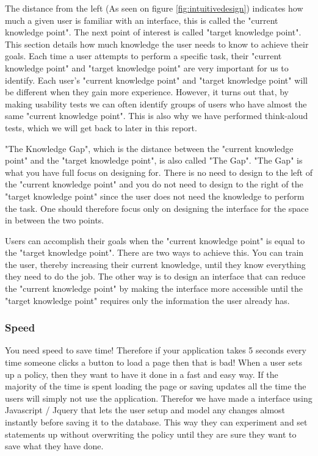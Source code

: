 The distance from the left (As seen on figure \ref{fig:intuitivedesign}) indicates how much a given user is familiar with an interface, this is called the "current knowledge point". The next point of interest is called "target knowledge point". This section details how much knowledge the user needs to know to achieve their goals.
Each time a user attempts to perform a specific task, their "current knowledge point" and "target knowledge point" are very important for us to identify.
Each user's "current knowledge point" and "target knowledge point" will be different when they gain more experience. However, it turns out that, by making usability tests we can often identify groups of users who have almost the same "current knowledge point". This is also why we have performed think-aloud tests, which we will get back to later in this report.

"The Knowledge Gap", which is the distance between the "current knowledge point" and the "target knowledge point", is also called "The Gap".
"The Gap" is what you have full focus on designing for. There is no need to design to the left of the "current knowledge point" and you do not need to design to the right of the "target knowledge point" since the user does not need the knowledge to perform the task. One should therefore focus only on designing the interface for the space in between the two points.

Users can accomplish their goals when the "current knowledge point" is equal to the "target knowledge point". There are two ways to achieve this. You can train the user, thereby increasing their current knowledge, until they know everything they need to do the job. The other way is to design an interface that can reduce the "current knowledge point" by making the interface more accessible until the "target knowledge point" requires only the information the user already has.


\subsubsection{Speed}
You need speed to save time! Therefore if your application takes 5 seconds every time someone clicks a button to load a page then that is bad! When a user sets up a policy, then they want to have it done in a fast and easy way. If the majority of the time is spent loading the page or saving updates all the time the users will simply not use the application. Therefor we have made a interface using Javascript / Jquery that lets the user setup and model any changes almost instantly before saving it to the database. This way they can experiment and set statements up without overwriting the policy until they are sure they want to save what they have done.

